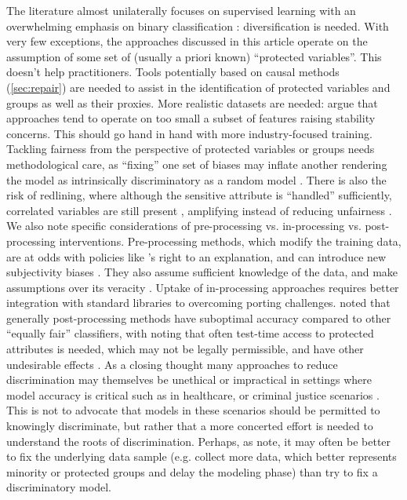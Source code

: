 The literature almost unilaterally focuses on supervised learning with an overwhelming emphasis on binary classification : diversification is needed. With very few exceptions, the approaches discussed in this article operate on the assumption of some set of (usually a priori known) ``protected variables''. This doesn't help practitioners. Tools potentially based on causal methods (\autoref{sec:repair}) are needed to assist in the identification of protected variables and groups as well as their proxies. 
More realistic datasets are needed:  argue that approaches tend to operate on too small a subset of features raising stability concerns. This should go hand in hand with more industry-focused training. Tackling fairness from the perspective of protected variables or groups needs methodological care, as ``fixing'' one set of biases may inflate another  rendering the model as intrinsically discriminatory as a random model .  There is also the risk of redlining, where although the sensitive attribute is ``handled'' sufficiently, correlated variables are still present , amplifying instead of reducing unfairness . 
We also note specific considerations of pre-processing vs. in-processing vs. post-processing interventions. Pre-processing methods, which modify the training data, are at odds with policies like \gdpr 's right to an explanation, and can introduce new subjectivity biases . They also assume sufficient knowledge of the data, and make assumptions over its veracity . Uptake of in-processing approaches requires better integration with standard \ml libraries to overcoming  porting challenges.  noted that generally post-processing methods have suboptimal accuracy compared to other ``equally fair'' classifiers, with  noting that often test-time access to protected attributes is needed, which may not be legally permissible, and have other undesirable effects .
As a closing thought many approaches to reduce discrimination may themselves be unethical or impractical in settings where model accuracy is critical such as in healthcare, or criminal justice scenarios . This is not to advocate that models in these scenarios should be permitted to knowingly discriminate, but rather that a more concerted effort is needed to understand the roots of discrimination.  Perhaps, as  note, it may often be better to fix the underlying data sample (e.g. collect more data, which better represents minority or protected groups and delay the modeling phase) than try to fix a discriminatory \ml model.
\label{sec:conclusion}



\endinput